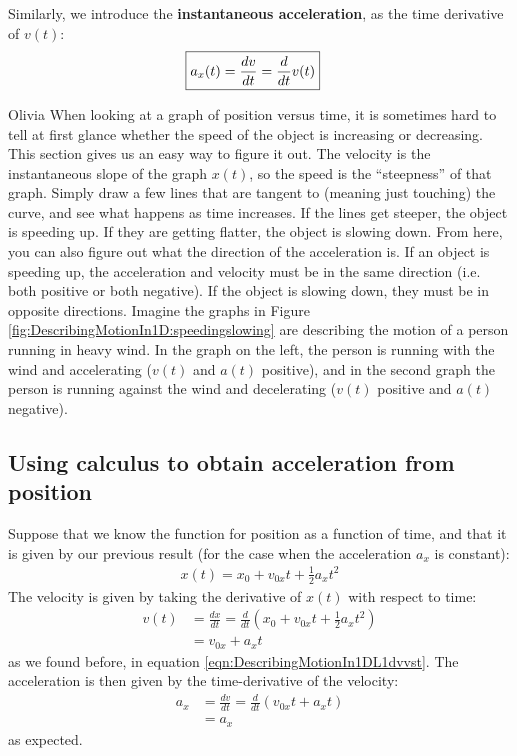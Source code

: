 Similarly, we introduce the \textbf{instantaneous acceleration}, as the time derivative of $v(t)$:
\begin{align}
\Aboxed{a_x(t)=\frac{dv}{dt}=\frac{d}{dt}v(t)}
\end{align}

\begin{studentOpinion}{Olivia}
When looking at a graph of position versus time, it is sometimes hard to tell at first glance whether the speed of the object is increasing or decreasing. This section gives us an easy way to figure it out. The velocity is the instantaneous slope of the graph $x(t)$, so the speed is the ``steepness'' of that graph. Simply draw a few lines that are tangent to (meaning just touching) the curve, and see what happens as time increases. If the lines get steeper, the object is speeding up. If they are getting flatter, the object is slowing down.
From here, you can also figure out what the direction of the acceleration is. If an object is speeding up, the acceleration and velocity must be in the same direction (i.e. both positive or both negative). If the object is slowing down, they must be in opposite directions. Imagine the graphs in Figure \ref{fig:DescribingMotionIn1D:speedingslowing} are describing the motion of a person running in heavy wind. In the graph on the left, the person is running with the wind and accelerating ($v(t)$ and $a(t)$ positive), and in the second graph the person is running against the wind and decelerating ($v(t)$ positive and $a(t)$ negative). 
\end{studentOpinion} 



\subsection{Using calculus to obtain acceleration from position}
\label{sec:DescribingMotionIn1D:calca}
Suppose that we know the function for position as a function of time, and that it is given by our previous result (for the case when the acceleration $a_x$ is constant):
\begin{align*}
x(t)=x_0+v_{0x}t+\frac{1}{2}a_xt^2
\end{align*}
The velocity is given by taking the derivative of $x(t)$ with respect to time:
\begin{align*}
v(t)&=\frac{dx}{dt}=\frac{d}{dt}\left(x_0+v_{0x}t+\frac{1}{2}a_xt^2\right)\\
&=v_{0x}+a_xt
\end{align*}
as we found before, in equation \ref{eqn:DescribingMotionIn1DL1dvvst}. The acceleration is then given by the time-derivative of the velocity:
\begin{align*}
a_x &= \frac{dv}{dt}=\frac{d}{dt}\left(v_{0x}t+a_xt\right)\\
&=a_x
\end{align*}
as expected.


